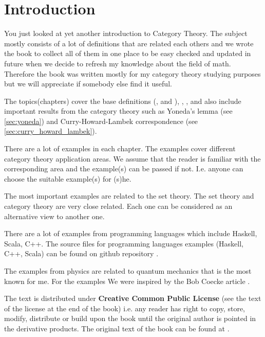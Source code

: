 \chapter*{Introduction}

You just looked at yet another introduction to Category Theory. The
subject mostly consists of a lot of definitions that are related each
others and we wrote the book to collect all of them in one
place to be easy checked and updated in future when we decide to refresh
my knowledge about the field of math. Therefore the book was written mostly
for my category theory studying 
purposes but we will appreciate if somebody else find it useful.

The topics(chapters) cover the base definitions
(,  and
), ,
,  and also include important
results from the category theory such as Yoneda's lemma (see
\cref{sec:yoneda}) and Curry-Howard-Lambek correspondence (see
\cref{sec:curry_howard_lambek}).  

There are a lot of 
examples in each chapter. The examples cover different category
theory application areas. We assume that the reader is familiar with
the corresponding area and the example(s) can be passed if not. I.e.
anyone can choose the suitable example(s) for (s)he. 

The most important examples are related to the set theory. The set
theory and category theory are very close related. Each one can be
considered as an alternative view to another one.

There are a lot of examples from programming languages which include
Haskell, Scala, C++. The source files for programming languages 
examples (Haskell, C++, Scala) can be found on github repository
\cite{bib:github:ivanmurashko}.  

The examples from physics are related to quantum mechanics that is the
most known for me. For the examples We were inspired by the Bob Coecke
article \cite{bib:arxiv:Bob_Coecke_2008}.

The text is distributed under \textbf{Creative Common Public License}
(see the text of the license at the end of the book)
i.e. any reader has right to copy, store, modify, distribute or build
upon the book until the original author is pointed in the derivative
products. The original text of the book can be found at
\cite{bib:github:ivanmurashko}.  

